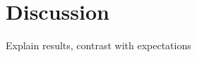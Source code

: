 \documentclass[twocolumn]{article}
\begin{document}
%
%


\section*{Discussion}

Explain results, contrast with expectations
\end{document}
